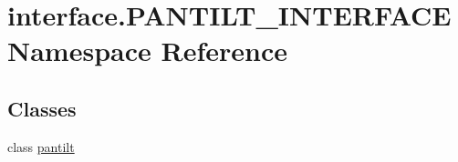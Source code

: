 \hypertarget{namespaceinterface_1_1PANTILT__INTERFACE}{}\section{interface.\+P\+A\+N\+T\+I\+L\+T\+\_\+\+I\+N\+T\+E\+R\+F\+A\+C\+E Namespace Reference}
\label{namespaceinterface_1_1PANTILT__INTERFACE}
\subsection*{Classes}
\begin{DoxyCompactItemize}
\item 
class \hyperlink{classinterface_1_1PANTILT__INTERFACE_1_1pantilt}{pantilt}
\end{DoxyCompactItemize}
